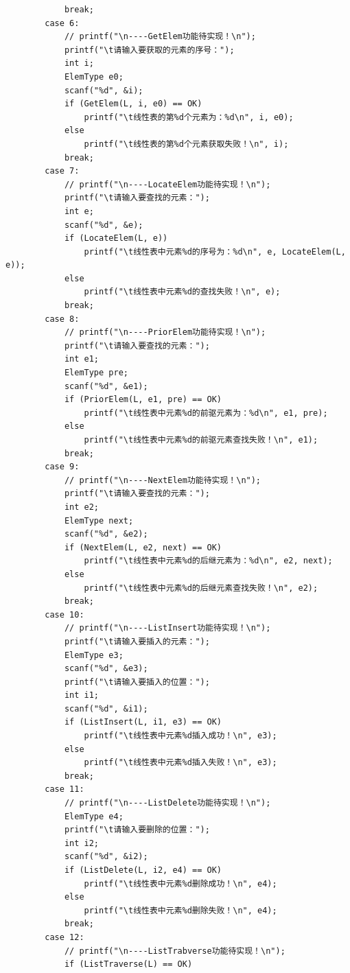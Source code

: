 \documentclass[supercite]{Experimental_Report}
\theoremstyle{definition}
\begin{document}
\begin{lstlisting}
            break;
        case 6:
            // printf("\n----GetElem功能待实现！\n");
            printf("\t请输入要获取的元素的序号：");
            int i;
            ElemType e0;
            scanf("%d", &i);
            if (GetElem(L, i, e0) == OK)
                printf("\t线性表的第%d个元素为：%d\n", i, e0);
            else
                printf("\t线性表的第%d个元素获取失败！\n", i);
            break;
        case 7:
            // printf("\n----LocateElem功能待实现！\n");
            printf("\t请输入要查找的元素：");
            int e;
            scanf("%d", &e);
            if (LocateElem(L, e))
                printf("\t线性表中元素%d的序号为：%d\n", e, LocateElem(L, e));
            else
                printf("\t线性表中元素%d的查找失败！\n", e);
            break;
        case 8:
            // printf("\n----PriorElem功能待实现！\n");
            printf("\t请输入要查找的元素：");
            int e1;
            ElemType pre;
            scanf("%d", &e1);
            if (PriorElem(L, e1, pre) == OK)
                printf("\t线性表中元素%d的前驱元素为：%d\n", e1, pre);
            else
                printf("\t线性表中元素%d的前驱元素查找失败！\n", e1);
            break;
        case 9:
            // printf("\n----NextElem功能待实现！\n");
            printf("\t请输入要查找的元素：");
            int e2;
            ElemType next;
            scanf("%d", &e2);
            if (NextElem(L, e2, next) == OK)
                printf("\t线性表中元素%d的后继元素为：%d\n", e2, next);
            else
                printf("\t线性表中元素%d的后继元素查找失败！\n", e2);
            break;
        case 10:
            // printf("\n----ListInsert功能待实现！\n");
            printf("\t请输入要插入的元素：");
            ElemType e3;
            scanf("%d", &e3);
            printf("\t请输入要插入的位置：");
            int i1;
            scanf("%d", &i1);
            if (ListInsert(L, i1, e3) == OK)
                printf("\t线性表中元素%d插入成功！\n", e3);
            else
                printf("\t线性表中元素%d插入失败！\n", e3);
            break;
        case 11:
            // printf("\n----ListDelete功能待实现！\n");
            ElemType e4;
            printf("\t请输入要删除的位置：");
            int i2;
            scanf("%d", &i2);
            if (ListDelete(L, i2, e4) == OK)
                printf("\t线性表中元素%d删除成功！\n", e4);
            else
                printf("\t线性表中元素%d删除失败！\n", e4);
            break;
        case 12:
            // printf("\n----ListTrabverse功能待实现！\n");
            if (ListTraverse(L) == OK)

\end{lstlisting}
\end{document}
